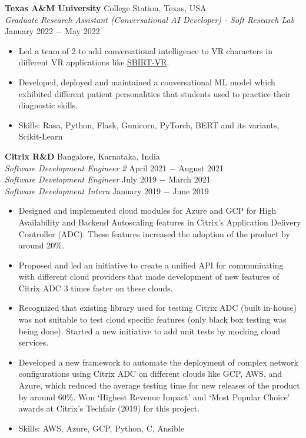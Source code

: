 \documentclass{article}
\begin{document}
\noindent \textbf{Texas A\&M University} \hfill College Station, Texas, USA\\
\textit{Graduate Research Assistant (Conversational AI Developer) - Soft Research Lab} \hfill January 2022 $-$ May 2022
\begin{itemize}[noitemsep,nolistsep,leftmargin=*]
\item {Led a team of 2 to add conversational intelligence to VR characters in different VR applications like \href{https://softinteraction.com/portfolio/sbirt-vr}{SBIRT-VR}}.
\item {Developed, deployed and maintained a conversational ML model which exhibited different patient personalities that students used to practice their diagnostic skills.}
\item Skills: Rasa, Python, Flask, Gunicorn, PyTorch, BERT and its variants, Scikit-Learn\\

\end{itemize}
\noindent \textbf{Citrix R\&D} \hfill Bangalore, Karnataka, India \\
\textit{Software Development Engineer 2} \hfill April 2021 $-$ August 2021 \\
\textit{Software Development Engineer} \hfill July 2019 $-$ March 2021 \\
\textit{Software Development Intern} \hfill January 2019 $-$ June 2019
\begin{itemize}[noitemsep,nolistsep,leftmargin=*]
\item {Designed and implemented cloud modules for Azure and GCP for High Availability and Backend Autoscaling features in Citrix's Application Delivery Controller (ADC). These features increased the adoption of the product by around 20\%.}
\item {Proposed and led an initiative to create a unified API for communicating with different cloud providers that made development of new features of Citrix ADC 3 times faster on these clouds.}
\item {Recognized that existing library used for testing Citrix ADC (built in-house) was not suitable to test cloud specific features (only black box testing was being done). Started a new initiative to add unit tests by mocking cloud services.}
\item {Developed a new framework to automate the deployment of complex network configurations using Citrix ADC on different clouds like GCP, AWS, and Azure, which reduced the average testing time for new releases of the product by around 60\%. Won `Highest Revenue Impact' and `Most Popular Choice' awards at Citrix's Techfair (2019) for this project.}
\item {Skills: AWS, Azure, GCP, Python, C, Ansible\\}
\end{itemize}
\end{document}
